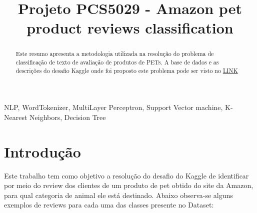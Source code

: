\documentclass[conference]{IEEEtran}
\begin{document}
\title{Projeto PCS5029 - Amazon pet product reviews classification}

\author{
}

\maketitle

\begin{abstract}
Este resumo apresenta a metodologia utilizada na resolução do problema de classificação de texto de avaliação de produtos de PETs. A base de dados e as descrições do desafio Kaggle onde foi proposto este problema pode ser visto no \href{https://www.kaggle.com/c/amazon-pet-product-reviews-classification/overview}{LINK}
\end{abstract}

\begin{IEEEkeywords}
NLP, WordTokenizer, MultiLayer Perceptron, Support Vector machine, K-Nearest Neighbors, Decision Tree
\end{IEEEkeywords}

\section{Introdução}

Este trabalho tem como objetivo a resolução do desafio do Kaggle de identificar por meio do review dos clientes de um produto de pet obtido do site da Amazon, para qual categoria de animal ele está destinado. Abaixo observa-se alguns exemplos de reviews para cada uma das classes presente no Dataset:
\end{document}
